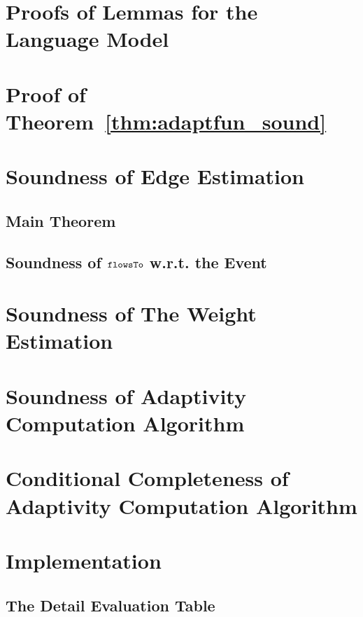 \section{Proofs of Lemmas for the Language Model}
\label{apdx:lemma_sec123}

\section{Proof of Theorem~\ref{thm:adaptfun_sound}}
\label{apdx:adapt_soundness}

\clearpage
\section{Soundness of Edge Estimation}
\label{apdx:flowsto_soundness}
\subsection{Main Theorem}

%
\subsection{Soundness of $\mathtt{flowsTo}$ w.r.t. the Event}
\label{apdx:flowsto_event_soundness}

\clearpage
\section{Soundness of The Weight Estimation}
\label{apdx:reachability_soundness}

\clearpage
\section{Soundness of Adaptivity Computation Algorithm}
\label{apdx:adaptalg_soundness}

\section{Conditional Completeness of Adaptivity Computation Algorithm}
\label{apdx:adaptalg_completeness}


\section{Implementation}
\label{appendix:implementation}
\subsection{The Detail Evaluation Table}
\label{apdx:eval_table}


